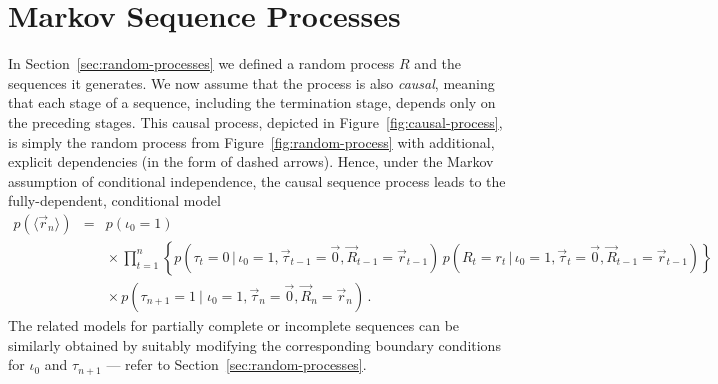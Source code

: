 \documentclass[a4paper]{article}
\begin{document}
\section{Markov Sequence Processes}
\label{sec:markov-processes}
In Section~\ref{sec:random-processes} we defined a random process $R$ and the sequences it generates.
We now assume that the process is also {\em causal}, meaning that each stage of a sequence,
including the termination stage, depends only on the preceding stages.
This causal process, depicted in Figure~\ref{fig:causal-process}, is simply the random process from
Figure~\ref{fig:random-process} with additional, explicit dependencies (in the form of dashed arrows).
Hence, under the Markov assumption of conditional independence,
the causal sequence process leads to the fully-dependent, conditional model
\begin{eqnarray}
p(\langle\vec{r}_n\rangle) & = &
p(\iota_0=1)
\nonumber\\&&
{}\times \prod_{t=1}^{n}\left\{p(\tau_t\!=\!0\,|\,\iota_0\!=\!1,\vec{\tau}_{t-1}\!=\!\vec{0},\vec{R}_{t-1}\!=\!\vec{r}_{t-1})
\,p(R_t\!=\!r_t\,|\,\iota_0\!=\!1,\vec{\tau}_t\!=\!\vec{0},\vec{R}_{t-1}\!=\!\vec{r}_{t-1})\right\}
\nonumber\\&&
{}\times p(\tau_{n+1}\!=\!1\:|\;\iota_0\!=\!1,\vec{\tau}_n\!=\!\vec{0},\vec{R}_n\!=\!\vec{r}_n)
\,.
\label{eq:temporal-model}
\end{eqnarray}
The related models for partially complete or incomplete sequences can be similarly obtained
by suitably modifying the corresponding boundary conditions for $\iota_0$ and $\tau_{n+1}$
--- refer to Section~\ref{sec:random-processes}.
\end{document}
